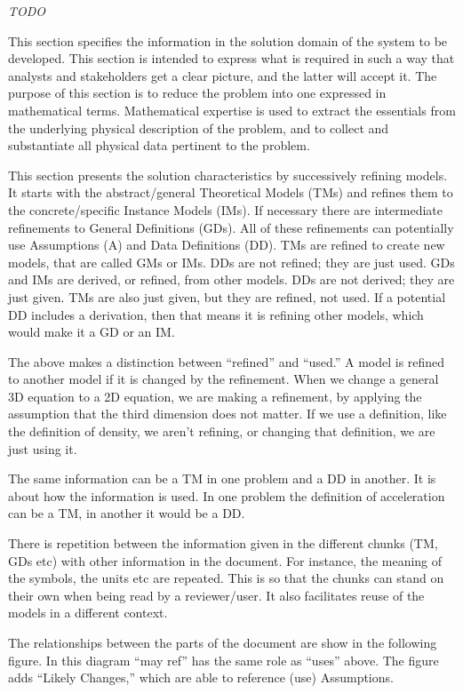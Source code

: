 \documentclass[12pt]{article}
\begin{document}
\emph{TODO}

This section specifies the information in the solution domain of the system to
be developed. This section is intended to express what is required in such a way
that analysts and stakeholders get a clear picture, and the latter will accept
it. The purpose of this section is to reduce the problem into one expressed in
mathematical terms. Mathematical expertise is used to extract the essentials
from the underlying physical description of the problem, and to collect and
substantiate all physical data pertinent to the problem.

This section presents the solution characteristics by successively refining
models.  It starts with the abstract/general Theoretical Models (TMs) and
refines them to the concrete/specific Instance Models (IMs).  If necessary there
are intermediate refinements to General Definitions (GDs).  All of these
refinements can potentially use Assumptions (A) and Data Definitions (DD). TMs
are refined to create new models, that are called GMs or IMs. DDs are not
refined; they are just used. GDs and IMs are derived, or refined, from other
models. DDs are not derived; they are just given. TMs are also just given, but
they are refined, not used.  If a potential DD includes a derivation, then that
means it is refining other models, which would make it a GD or an IM.

The above makes a distinction between ``refined'' and ``used.'' A model is
refined to another model if it is changed by the refinement. When we change a
general 3D equation to a 2D equation, we are making a refinement, by applying
the assumption that the third dimension does not matter. If we use a definition,
like the definition of density, we aren't refining, or changing that definition,
we are just using it.

The same information can be a TM in one problem and a DD in another.  It is
about how the information is used.  In one problem the definition of
acceleration can be a TM, in another it would be a DD.

There is repetition between the information given in the different chunks (TM,
GDs etc) with other information in the document.  For instance, the meaning of
the symbols, the units etc are repeated.  This is so that the chunks can stand
on their own when being read by a reviewer/user.  It also facilitates reuse of
the models in a different context.

The relationships between the parts of the document are show in the
following figure.  In this diagram ``may ref'' has the same role as ``uses''
above.  The figure adds ``Likely Changes,'' which are able to reference (use)
Assumptions.
\end{document}
